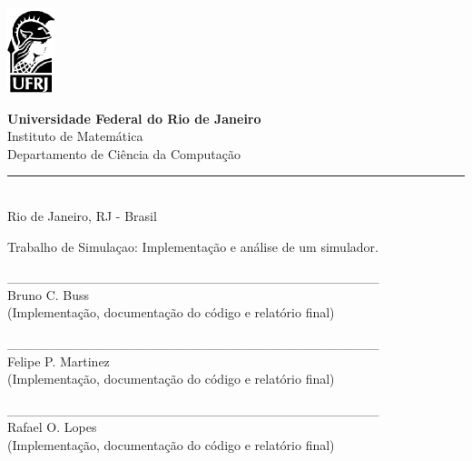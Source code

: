 \documentclass[a4paper,10pt]{article}
\begin{document}
\begin{titlepage}

\begin{minipage}{0.2\linewidth}
 \includegraphics[]{./minerva.png}
\end{minipage}
\begin{minipage}{0.8\linewidth}
 \textbf{Universidade Federal do Rio de Janeiro}\\
 Instituto de Matemática\\
 Departamento de Ciência da Computação\\
 \rule{0.8\linewidth}{0.5mm}\\
 Rio de Janeiro, RJ - Brasil
\end{minipage}

\begin{center}

\vspace{2cm}

\Large
Trabalho de Simulaçao: Implementação e análise de um simulador.

\vspace{1cm}

\large

\_\_\_\_\_\_\_\_\_\_\_\_\_\_\_\_\_\_\_\_\_\_\_\_\_\_\_\_\_\_\_\_\_\_\_\_\_\_\_\\
Bruno C. Buss\\(Implementação, documentação do código e relatório final)\\

\vspace{0.5cm}

\_\_\_\_\_\_\_\_\_\_\_\_\_\_\_\_\_\_\_\_\_\_\_\_\_\_\_\_\_\_\_\_\_\_\_\_\_\_\_\\
Felipe P. Martinez\\(Implementação, documentação do código e relatório final)\\

\vspace{0.5cm}

\_\_\_\_\_\_\_\_\_\_\_\_\_\_\_\_\_\_\_\_\_\_\_\_\_\_\_\_\_\_\_\_\_\_\_\_\_\_\_\\
Rafael O. Lopes\\(Implementação, documentação do código e relatório final)\\


\end{center}
\end{titlepage}
\end{document}
